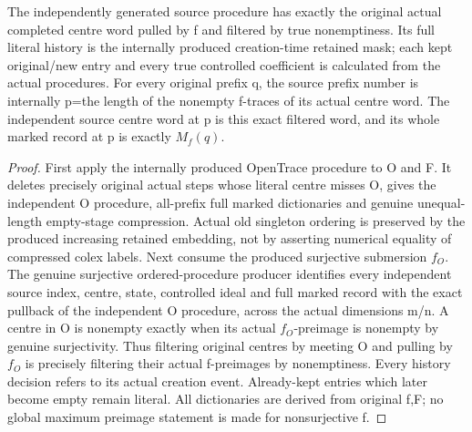 \begin{theorem}
\label{hir:submersion-image-trace-independent-centres}
\leanok
{}
The independently generated source procedure has exactly the original actual completed centre word pulled by f and filtered by true nonemptiness. Its full literal history is the internally produced creation-time retained mask; each kept original/new entry and every true controlled coefficient is calculated from the actual procedures. For every original prefix q, the source prefix number is internally p=the length of the nonempty f-traces of its actual centre word. The independent source centre word at p is this exact filtered word, and its whole marked record at p is exactly $M_f(q)$.
\end{theorem}
\begin{proof}
First apply the internally produced OpenTrace procedure to O and F. It deletes precisely original actual steps whose literal centre misses O, gives the independent O procedure, all-prefix full marked dictionaries and genuine unequal-length empty-stage compression. Actual old singleton ordering is preserved by the produced increasing retained embedding, not by asserting numerical equality of compressed colex labels. Next consume the produced surjective submersion $f_O$. The genuine surjective ordered-procedure producer identifies every independent source index, centre, state, controlled ideal and full marked record with the exact pullback of the independent O procedure, across the actual dimensions m/n. A centre in O is nonempty exactly when its actual $f_O$-preimage is nonempty by genuine surjectivity. Thus filtering original centres by meeting O and pulling by $f_O$ is precisely filtering their actual f-preimages by nonemptiness. Every history decision refers to its actual creation event. Already-kept entries which later become empty remain literal. All dictionaries are derived from original f,F; no global maximum preimage statement is made for nonsurjective f.
\end{proof}

